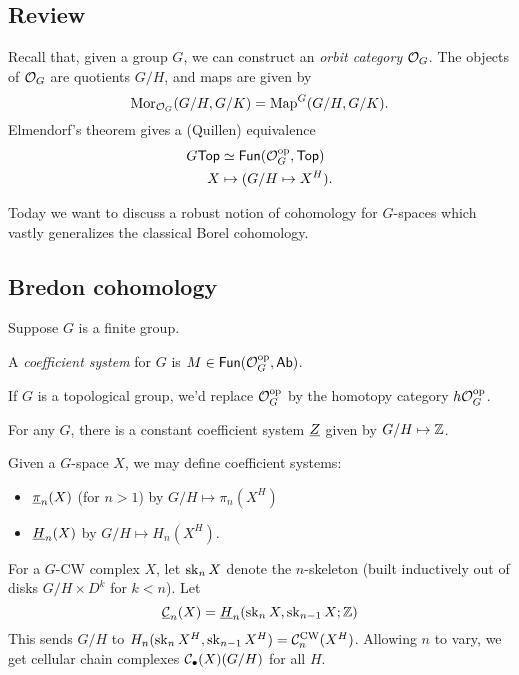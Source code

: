 \documentclass{article}
\begin{document}
\subsection{Review}

Recall that, given a group $G$, we can construct an \emph{orbit category} $\mathcal{O}_G$.
The objects of $\mathcal{O}_G$ are quotients $G / H$, and maps are given by
\[
  \operatorname{Mor}_{\mathcal{O}_G}(G/H, G/K) = \operatorname{Map}^G(G/H, G/K).
\]
Elmendorf's theorem gives a (Quillen) equivalence
\begin{align*}
  G\mathsf{Top} &\simeq \mathsf{Fun}(\mathcal{O}_G^{\mathrm{op}}, \mathsf{Top}) \\
  X &\mapsto (G/H \mapsto X^H).
\end{align*}

Today we want to discuss a robust notion of cohomology for $G$-spaces which vastly generalizes the classical Borel cohomology.

\subsection{Bredon cohomology}

Suppose $G$ is a finite group.

\begin{dfn}
  A \emph{coefficient system} for $G$ is $M \in \mathsf{Fun}(\mathcal{O}_G^{\mathrm{op}}, \mathsf{Ab})$.
\end{dfn}

\begin{rmk}
  If $G$ is a topological group, we'd replace $\mathcal{O}_G^{\mathrm{op}}$ by the homotopy category $h\mathcal{O}_G^{\mathrm{op}}$.
\end{rmk}

\begin{ex}
  For any $G$, there is a constant coefficient system $\underline{Z}$ given by $G/H \mapsto \mathbb{Z}$.
\end{ex}

\begin{ex}
  Given a $G$-space $X$, we may define coefficient systems:
  \begin{itemize}
    \item $\underline{\pi}_n(X)$ (for $n > 1$) by $G/H \mapsto \pi_n(X^H)$
    \item $\underline{H}_n(X)$ by $G/H \mapsto H_n(X^H)$.
  \end{itemize}
\end{ex}

For a $G$-CW complex $X$, let $\operatorname{sk}_n X$ denote the $n$-skeleton (built inductively out of disks $G / H \times D^k$ for $k < n$).
Let
\[
  \underline{\mathcal{C}}_n(X) = \underline{H}_n(\operatorname{sk}_n X, \operatorname{sk}_{n-1} X; \mathbb{Z})
\]
This sends $G/H$ to $H_n(\operatorname{sk}_n X^H, \operatorname{sk}_{n-1} X^H) = \mathcal{C}_n^{\textrm{CW}}(X^H)$.
Allowing $n$ to vary, we get cellular chain complexes $\mathcal{C}_\bullet(X)(G/H)$ for all $H$.
\end{document}
